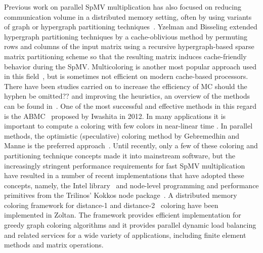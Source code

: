 Previous work on parallel SpMV multiplication has also focused on reducing communication volume in a distributed memory setting, often by using variants of graph or hypergraph partitioning techniques~\cite{Catalyurek:1999}. Yzelman and Bisseling \cite{doi:10.1137/080733243,Yzelman-thesis-2011} extended hypergraph partitioning techniques by a cache-oblivious method by permuting rows and columns of the input matrix using a recursive hypergraph-based sparse matrix partitioning scheme so that the resulting matrix induces cache-friendly behavior during the SpMV. Multicoloring is another most popular approach used in this field~\cite{MC}, but is sometimes not efficient on modern cache-based processors. There have been studies carried on to increase the efficiency of \acrfull{MC} {\CA should the hyphen be omitted??} and improving the heuristics, an overview of the methods can be found in~\cite{dist_k_def,COLPACK,equitable_color}. One of the most successful and effective methods in this regard is the \acrfull{ABMC}~\cite{ABMC} proposed by Iwashita \etal in 2012. In many applications it is important to compute a coloring with few colors in near-linear time \cite{doi:10.1137/13093426X}. In parallel methods, the optimistic (speculative) coloring method by Gebremedhin and Manne \cite{gebremedhin2000scalable} is the preferred approach~\cite{Boman:2016}. 
Until recently, only a few of these coloring and partitioning technique concepts made it into mainstream software, but the increasingly stringent performance requirements for fast SpMV multiplication have resulted in a number of recent implementations that have adopted these concepts, namely, the Intel \MKL library~\cite{MKL} and node-level programming and performance primitives from the Trilinos’ Kokkos node package~\cite{kokkos}. A distributed memory coloring framework for distance-1\cite{BOZDAG2008515} and distance-2~\cite{doi:10.1137/080732158} coloring have been implemented in Zoltan. The framework provides efficient implementation for greedy graph coloring algorithms and it provides parallel dynamic load balancing and related services for a wide variety of applications, including finite element methods and matrix operations.


